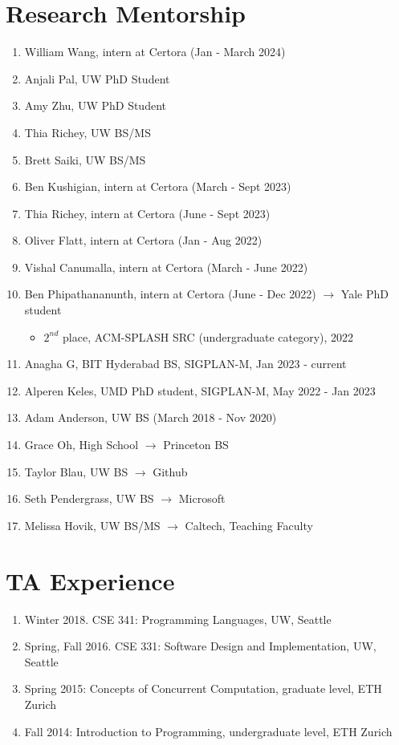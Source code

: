 \documentclass[margin, 10pt]{res} %
\begin{document}
\begin{resume}
\section{Research Mentorship}
\begin{enumerate}
  \item William Wang, intern at Certora (Jan - March 2024)
  \item Anjali Pal, UW PhD Student
  \item Amy Zhu, UW PhD Student
  \item Thia Richey, UW BS/MS
  \item Brett Saiki, UW BS/MS
  \item Ben Kushigian, intern at Certora (March - Sept 2023)
  \item Thia Richey, intern at Certora (June - Sept 2023)
  \item Oliver Flatt, intern at Certora (Jan - Aug 2022)
  \item Vishal Canumalla, intern at Certora (March - June 2022)
  \item Ben Phipathananunth, intern at Certora (June - Dec 2022) $\rightarrow$ Yale PhD student
     \begin{itemize}
       \item $2^{nd}$ place, ACM-SPLASH SRC (undergraduate category), 2022
     \end{itemize}
  \item Anagha G, BIT Hyderabad BS, SIGPLAN-M, Jan 2023 - current
  \item Alperen Keles, UMD PhD student, SIGPLAN-M, May 2022 - Jan 2023
  \item Adam Anderson, UW BS (March 2018 - Nov 2020)
  \item Grace Oh, High School $\rightarrow$ Princeton BS
  \item Taylor Blau, UW BS $\rightarrow$ Github
  \item Seth Pendergrass, UW BS $\rightarrow$ Microsoft
  \item Melissa Hovik, UW BS/MS $\rightarrow$ Caltech, Teaching Faculty
\end{enumerate}

\section{TA Experience}
\begin{enumerate}
\item Winter 2018. CSE 341: Programming Languages, UW, Seattle
\item Spring, Fall 2016. CSE 331: Software Design and Implementation, UW, Seattle
\item Spring 2015: Concepts of Concurrent Computation, graduate level, ETH Zurich
\item Fall 2014: Introduction to Programming, undergraduate level, ETH Zurich
\end{enumerate}



\end{resume}
\end{document}
